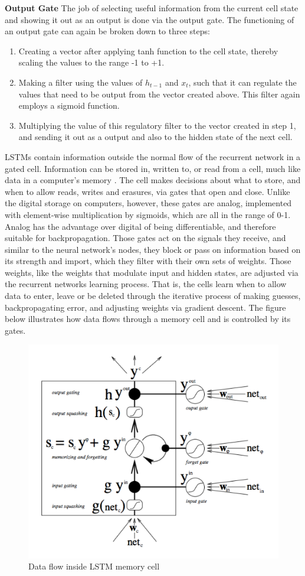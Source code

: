 \bigskip
\textbf{Output Gate}
The job of selecting useful information from the current cell state and showing it out as an output is done via the output gate. The functioning of an output gate can again be broken down to three steps:
\begin{enumerate}
    \item Creating a vector after applying tanh function to the cell state, thereby scaling the values to the range -1 to +1.
    \item Making a filter using the values of $h_{t-1}$ and $x_t$, such that it can regulate the values that need to be output from the vector created above. This filter again employs a sigmoid function.
    \item Multiplying the value of this regulatory filter to the vector created in step 1, and sending it out as a output and also to the hidden state of the next cell.
\end{enumerate}
\par LSTMs contain information outside the normal flow of the recurrent network in a gated cell. Information can be stored in, written to, or read from a cell, much like data in a computer’s memory \cite{franccois2017deep}. The cell makes decisions about what to store, and when to allow reads, writes and erasures, via gates that open and close. Unlike the digital storage on computers, however, these gates are analog, implemented with element-wise multiplication by sigmoids, which are all in the range of 0-1. Analog has the advantage over digital of being differentiable, and therefore suitable for backpropagation. Those gates act on the signals they receive, and similar to the neural network’s nodes, they block or pass on information based on its strength and import, which they filter with their own sets of weights. Those weights, like the weights that modulate input and hidden states, are adjusted via the recurrent networks learning process. That is, the cells learn when to allow data to enter, leave or be deleted through the iterative process of making guesses, backpropagating error, and adjusting weights via gradient descent. The figure below \cite{nicholson2019beginner} illustrates how data flows through a memory cell and is controlled by its gates.
\begin{figure}[ht!]
\centering
\includegraphics[width=0.6\linewidth]{project/a.png}

\caption{Data flow inside LSTM memory cell}
\end{figure}
